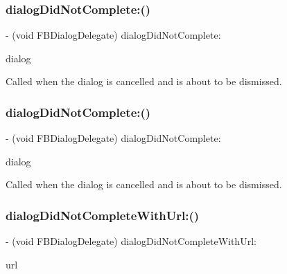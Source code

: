 \subsubsection{\texorpdfstring{dialog\+Did\+Not\+Complete\+:()}{dialogDidNotComplete:()}\hspace{0.1cm}{\footnotesize\ttfamily [1/2]}}
{\footnotesize\ttfamily -\/ (void F\+B\+Dialog\+Delegate) dialog\+Did\+Not\+Complete\+: \begin{DoxyParamCaption}\item[{(\hyperlink{interfaceFBDialog}{F\+B\+Dialog} $\ast$)}]{dialog }\end{DoxyParamCaption}\hspace{0.3cm}{\ttfamily [optional]}}

Called when the dialog is cancelled and is about to be dismissed. \mbox{\label{protocolFBDialogDelegate_01-p_a0198ffe12617cb25742d9aea1aaa4526}} 
\subsubsection{\texorpdfstring{dialog\+Did\+Not\+Complete\+:()}{dialogDidNotComplete:()}\hspace{0.1cm}{\footnotesize\ttfamily [2/2]}}
{\footnotesize\ttfamily -\/ (void F\+B\+Dialog\+Delegate) dialog\+Did\+Not\+Complete\+: \begin{DoxyParamCaption}\item[{(\hyperlink{interfaceFBDialog}{F\+B\+Dialog} $\ast$)}]{dialog }\end{DoxyParamCaption}\hspace{0.3cm}{\ttfamily [optional]}}

Called when the dialog is cancelled and is about to be dismissed. \mbox{\label{protocolFBDialogDelegate_01-p_ae7fe5c8835467a4dd9b3cb5513991568}} 
\subsubsection{\texorpdfstring{dialog\+Did\+Not\+Complete\+With\+Url\+:()}{dialogDidNotCompleteWithUrl:()}\hspace{0.1cm}{\footnotesize\ttfamily [1/2]}}
{\footnotesize\ttfamily -\/ (void F\+B\+Dialog\+Delegate) dialog\+Did\+Not\+Complete\+With\+Url\+: \begin{DoxyParamCaption}\item[{(N\+S\+U\+RL $\ast$)}]{url }\end{DoxyParamCaption}\hspace{0.3cm}{\ttfamily [optional]}}

